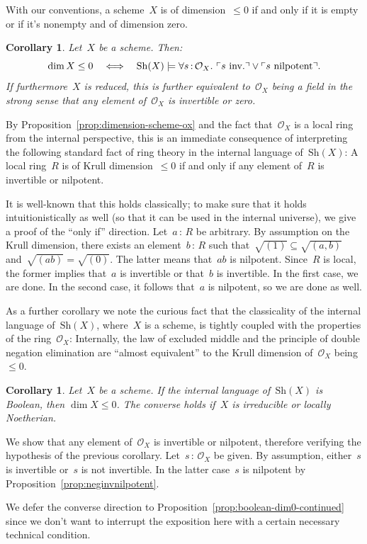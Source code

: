 \documentclass[10pt,reqno,a4paper]{amsbook}
\makeatletter
\theoremstyle{definition}
\theoremstyle{plain}
\newtheorem{cor}[defn]{Corollary}
\theoremstyle{remark}
\renewcommand{\O}{\mathcal{O}}
\newcommand{\Sh}{\mathrm{Sh}}
\newcommand{\?}{\,{:}\,}
\renewcommand{\_}{\mathpunct{.}\,}
\newcommand{\speak}[1]{\ulcorner\text{\textnormal{#1}}\urcorner}
\newcommand{\inv}{inv.\@}
\renewenvironment{proof}[1][\proofname]{\par
  \pushQED{\qed}%
  \normalfont \topsep6\p@\@plus6\p@\relax
  \trivlist
  \item[\hskip\labelsep
        \itshape
    #1\@addpunct{.}]\ignorespaces
}{%
  \popQED\endtrivlist\@endpefalse
}
\makeatother
\begin{document}
With our conventions, a scheme~$X$ is of dimension~$\leq 0$ if and only if it
is empty or if it's nonempty and of dimension zero.
\begin{cor}\label{cor:scheme-dimension-zero}
Let~$X$ be a scheme. Then:
\[ \dim X \leq 0 \quad\Longleftrightarrow\quad
  \Sh(X) \models \forall s\?\O_X\_ \speak{$s$ \inv} \vee \speak{$s$ nilpotent}.
  \]
If furthermore~$X$ is reduced, this is further equivalent to~$\O_X$ being a
field in the strong sense that any element of~$\O_X$ is invertible or zero.
\end{cor}
\begin{proof}By Proposition~\ref{prop:dimension-scheme-ox} and the fact that~$\O_X$ is a local ring from
the internal perspective, this is an immediate consequence of
interpreting the following standard fact of ring theory in the internal
language of~$\Sh(X)$: A local ring~$R$ is of Krull
dimension~$\leq 0$ if and only if any element of~$R$ is invertible or
nilpotent.

It is well-known that this holds classically; to make sure that it
holds intuitionistically as well (so that it can be used in the internal
universe), we give a proof of the ``only if'' direction. Let~$a \? R$ be
arbitrary. By assumption on the Krull dimension, there exists an element~$b \?
R$ such that~$\sqrt{(1)} \subseteq \sqrt{(a,b)}$ and~$\sqrt{(ab)} =
\sqrt{(0)}$. The latter means that~$ab$ is nilpotent. Since~$R$ is local, the
former implies that~$a$ is invertible or that~$b$ is invertible. In the first
case, we are done. In the second case, it follows that~$a$ is nilpotent, so we
are done as well.
\end{proof}

As a further corollary we note the curious fact that the classicality of the
internal language of~$\Sh(X)$, where~$X$ is a scheme, is tightly coupled with
the properties of the ring~$\O_X$: Internally, the law of excluded middle and
the principle of double negation elimination are ``almost equivalent'' to the
Krull dimension of~$\O_X$ being~$\leq 0$.
\begin{cor}\label{cor:boolean-dim0}
Let~$X$ be a scheme. If the internal language of~$\Sh(X)$ is Boolean, then
$\dim X \leq 0$. The converse holds if~$X$ is irreducible or locally Noetherian.
\end{cor}
\begin{proof}
We show that any element of~$\O_X$ is invertible or nilpotent, therefore
verifying the hypothesis of the previous corollary.
Let~$s\?\O_X$ be given. By assumption, either~$s$ is invertible or~$s$ is not
invertible. In the latter case~$s$ is nilpotent by
Proposition~\ref{prop:neginvnilpotent}.

We defer the converse direction to
Proposition~\ref{prop:boolean-dim0-continued} since we don't want to interrupt
the exposition here with a certain necessary technical condition.
\end{proof}
\end{document}
